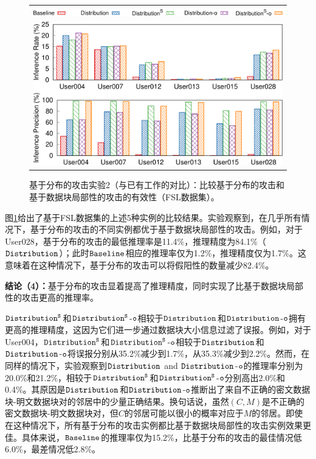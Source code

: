 \begin{figure}[!htbp]
    \centering
    \begin{tabular}{c}
        \includegraphics[width=.7\textwidth]{pic/legend-fsl-bar.pdf}\\
        \includegraphics[width=.7\textwidth]{pic/distribution-comparison-fsl.pdf} 
    \end{tabular}
    \caption{基于分布的攻击实验2（与已有工作的对比）：比较基于分布的攻击和基于数据块局部性的攻击的有效性（FSL数据集）。}
    \label{fig:distribution-comparison-fsl}
\end{figure}

图\ref{fig:distribution-comparison-fsl}给出了基于FSL数据集的上述5种实例的比较结果。实验观察到，在几乎所有情况下，基于分布的攻击的不同实例都优于基于数据块局部性的攻击。例如，对于User028，基于分布的攻击的最低推理率是11.4\%，推理精度为84.1\%（$\tt Distribution$）；此时$\tt Baseline$相应的推理率仅为1.2\%，推理精度仅为1.7\%。这意味着在这种情况下，基于分布的攻击可以将假阳性的数量减少82.4\%。

\textbf{结论（4）：}基于分布的攻击显着提高了推理精度，同时实现了比基于数据块局部性的攻击更高的推理率。 

$\tt Distribution^S$和$\tt Distribution^S$-$\tt o$相较于$\tt Distribution$和$\tt Distribution$-$\tt o$拥有更高的推理精度，这因为它们进一步通过数据块大小信息过滤了误报。例如，对于User004，$\tt Distribution^S$和$\tt Distribution^S$-$\tt o$相较于$\tt Distribution$和$\tt Distribution$-$\tt o$将误报分别从35.2\%减少到1.7\%，从35.3\%减少到2.2\%。然而，在同样的情况下，实验观察到$\tt Distribution$ and $\tt Distribution$-$\tt o$的推理率分别为20.0\%和21.2\%，相较于$\tt Distribution^S$和$\tt Distribution^S$-$\tt o$分别高出2.0\%和0.4\%。其原因是$\tt Distribution$和$\tt Distribution$-$\tt o$推断出了来自不正确的密文数据块-明文数据块对的邻居中的少量正确结果。换句话说，虽然$(C, M)$是不正确的密文数据块-明文数据块对，但$C$的邻居可能以很小的概率对应于$M$的邻居。即使在这种情况下，所有基于分布的攻击实例都比基于数据块局部性的攻击实例效果更佳。具体来说，$\tt Baseline$的推理率仅为15.2\%，比基于分布的攻击的最佳情况低6.0\%，最差情况低2.8\%。  

